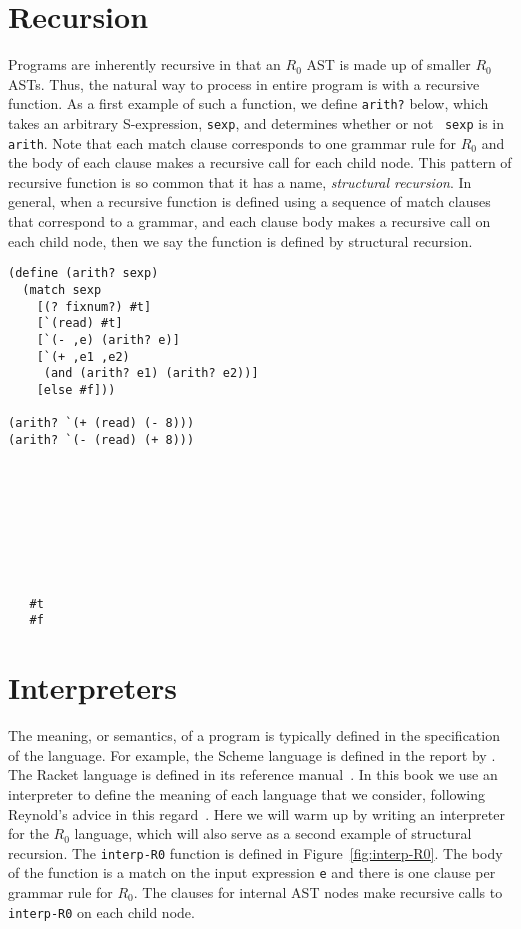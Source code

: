 \documentclass[11pt]{book}
\begin{document}
\section{Recursion}
\label{sec:recursion}

Programs are inherently recursive in that an $R_0$ AST is made
up of smaller $R_0$ ASTs. Thus, the natural way to process in
entire program is with a recursive function.  As a first example of
such a function, we define \texttt{arith?} below, which takes an
arbitrary S-expression, {\tt sexp}, and determines whether or not {\tt
  sexp} is in {\tt arith}. Note that each match clause corresponds to
one grammar rule for $R_0$ and the body of each clause makes a
recursive call for each child node. This pattern of recursive function
is so common that it has a name, \emph{structural recursion}.  In
general, when a recursive function is defined using a sequence of
match clauses that correspond to a grammar, and each clause body makes
a recursive call on each child node, then we say the function is
defined by structural recursion.
\begin{center}
\begin{minipage}{0.7\textwidth}
\begin{lstlisting}
(define (arith? sexp)
  (match sexp
    [(? fixnum?) #t]
    [`(read) #t]
    [`(- ,e) (arith? e)]
    [`(+ ,e1 ,e2)
     (and (arith? e1) (arith? e2))]
    [else #f]))

(arith? `(+ (read) (- 8)))
(arith? `(- (read) (+ 8)))
\end{lstlisting}
\end{minipage}
\vrule
\begin{minipage}{0.25\textwidth}
\begin{lstlisting}








   #t
   #f
\end{lstlisting}
\end{minipage}
\end{center}



\section{Interpreters}
\label{sec:interp-R0}

The meaning, or semantics, of a program is typically defined in the
specification of the language. For example, the Scheme language is
defined in the report by \cite{SPERBER:2009aa}. The Racket language is
defined in its reference manual~\citep{plt-tr}. In this book we use an
interpreter to define the meaning of each language that we consider,
following Reynold's advice in this
regard~\citep{reynolds72:_def_interp}. Here we will warm up by writing
an interpreter for the $R_0$ language, which will also serve
as a second example of structural recursion. The \texttt{interp-R0}
function is defined in Figure~\ref{fig:interp-R0}. The body of the
function is a match on the input expression \texttt{e} and there is
one clause per grammar rule for $R_0$. The clauses for
internal AST nodes make recursive calls to \texttt{interp-R0} on
each child node.
\end{document}
